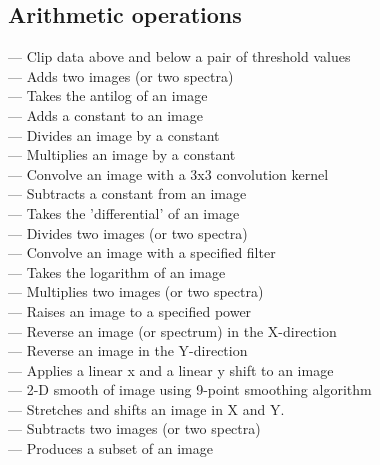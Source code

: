 
\subsection{\label{classifarith}Arithmetic operations}

 --- Clip data above and below a pair of threshold values\\
 --- Adds two images (or two spectra)\\
 --- Takes the antilog of an image\\
 --- Adds a constant to an image\\
 --- Divides an image by a constant\\
 --- Multiplies an image by a constant\\
 --- Convolve an image with a 3x3 convolution kernel\\
 --- Subtracts a constant from an image\\
 --- Takes the 'differential' of an image\\
 --- Divides two images (or two spectra)\\
 --- Convolve an image with a specified filter\\
 --- Takes the logarithm of an image\\
 --- Multiplies two images (or two spectra)\\
 --- Raises an image to a specified power\\
 --- Reverse an image (or spectrum) in the X-direction\\
 --- Reverse an image in the Y-direction\\
 --- Applies a linear x and a linear y shift to an image\\
 --- 2-D smooth of image using 9-point smoothing algorithm\\
 --- Stretches and shifts an image in X and Y.\\
 --- Subtracts two images (or two spectra)\\
 --- Produces a subset of an image\\
